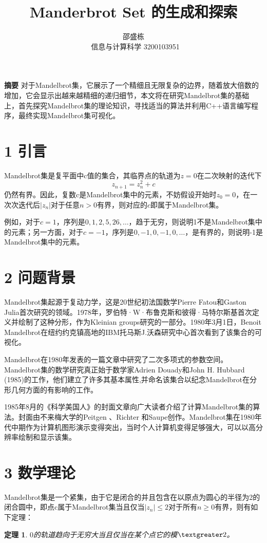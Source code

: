 \documentclass[twocolumn]{ctexart}
\title{\textbf{Manderbrot Set 的生成和探索}}
\author{ 邵盛栋  \\\ 信息与计算科学 3200103951 }
\date{\vspace{-2em}}
\newtheorem{thm}{定理}
\begin{document}
	
	\maketitle
	
	\begin{strip}
		
		\noindent  \textbf{摘要} \quad 对于Mandelbrot集，它展示了一个精细且无限复杂的边界，随着放大倍数的增加，它会显示出越来越精细的递归细节，本文将在研究Mandelbrot集的基础上，首先探究Mandelbrot集的理论知识，寻找适当的算法并利用C++语言编写程序，最终实现Mandelbrot集可视化。
		\\
	\end{strip}
	
	
	\section*{1  引言}
	Mandelbrot集是复平面中c值的集合，其临界点的轨道为$z=0$在二次映射的迭代下
	\[z_{n+1}=z_{n}^{2}+c\]
	仍然有界。因此，复数c是Mandelbrot集中的元素，不妨假设开始时$z_{0}=0$，在一次次迭代后$|z_{n}|$对于任意$n>0$有界，则对应的$c$即属于Mandelbrot集。
	
	例如，对于$c=1$，序列是$ 0,1,2,5,26,\dots $，趋于无穷，则说明1不是Mandelbrot集中的元素；另一方面，对于$ c=-1 $，序列是$ 0,-1,0,-1,0,\dots $，是有界的，则说明-1是Mandelbrot集中的元素\cite{devaney2006unveiling}。
	\section*{2 问题背景}
	Mandelbrot集起源于复动力学，这是20世纪初法国数学Pierre Fatou和Gaston Julia首次研究的领域。1978年，罗伯特·W·布鲁克斯和彼得·马特尔斯基首次定义并绘制了这种分形，作为Kleinian groups研究的一部分。1980年3月1日，Benoit Mandelbrot在纽约约克镇高地的IBM托马斯J.沃森研究中心首次看到了该集合的可视化。
	
	Mandelbrot在1980年发表的一篇文章中研究了二次多项式的参数空间。Mandelbrot集的数学研究真正始于数学家Adrien Douady和John H. Hubbard (1985)的工作，他们建立了许多其基本属性,并命名该集合以纪念Mandelbrot在分形几何方面的有影响的工作。
	
	1985年8月的《科学美国人》的封面文章向广大读者介绍了计算Mandelbrot集的算法。封面由不来梅大学的Peitgen 、Richter 和Saupe创作。Mandelbrot集在1980年代中期作为计算机图形演示变得突出，当时个人计算机变得足够强大，可以以高分辨率绘制和显示该集。
	\section*{3 数学理论}
	Mandelbrot集是一个紧集，由于它是闭合的并且包含在以原点为圆心的半径为2的闭合圆中，即点c属于Mandelbrot集当且仅当$ |z_{n}|\leq2 $对于所有$ n\geq0 $有界\cite{douady1986julia}，则有如下定理：
	\begin{thm} 
	$ 0 $的轨道趋向于无穷大当且仅当在某个点它的模$ \textgreater2 $。
	\end{thm}
	
\end{document}

